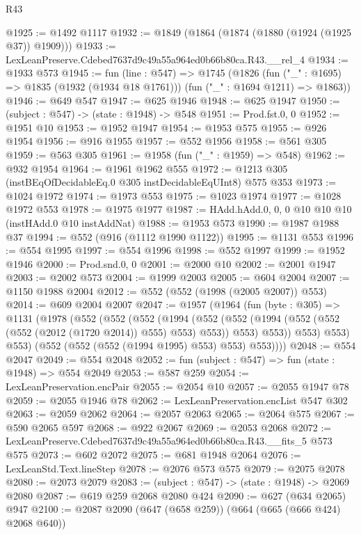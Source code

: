 \begin{lexlean}{R43}
\begin{coremodule}
@1925 := @1492 @1117
@1932 := @1849 (@1864 (@1874 (@1880 (@1924 (@1925 @37)) @1909)))
@1933 := LexLeanPreserve.Cdebed7637d9c49a55a964ed0b66b80ca.R43.__rel_4
@1934 := @1933 @573
@1945 := fun (line : @547) =>
  @1745
    (@1826
      (fun ("_" : @1695) => @1835 (@1932 (@1934 @18 @1761)))
      (fun ("_" : @1694 @1211) => @1863))
@1946 := @649 @547
@1947 := @625 @1946
@1948 := @625 @1947
@1950 := (subject : @547) -> (state : @1948) -> @548
@1951 := Prod.fst.{0, 0}
@1952 := @1951 @10
@1953 := @1952 @1947
@1954 := @1953 @575
@1955 := @926 @1954
@1956 := @916 @1955
@1957 := @552 @1956
@1958 := @561 @305
@1959 := @563 @305
@1961 := @1958 (fun ("_" : @1959) => @548)
@1962 := @932 @1954
@1964 := @1961 @1962 @555
@1972 := @1213 @305 (instBEqOfDecidableEq.{0} @305 instDecidableEqUInt8) @575 @353
@1973 := @1024 @1972
@1974 := @1973 @553
@1975 := @1023 @1974
@1977 := @1028 @1972 @553
@1978 := @1975 @1977
@1987 := HAdd.hAdd.{0, 0, 0} @10 @10 @10 (instHAdd.{0} @10 instAddNat)
@1988 := @1953 @573
@1990 := @1987 @1988 @37
@1994 := @552 (@916 (@1112 @1990 @1122))
@1995 := @1131 @553
@1996 := @554 @1995
@1997 := @554 @1996
@1998 := @552 @1997
@1999 := @1952 @1946
@2000 := Prod.snd.{0, 0}
@2001 := @2000 @10
@2002 := @2001 @1947
@2003 := @2002 @573
@2004 := @1999 @2003
@2005 := @604 @2004
@2007 := @1150 @1988 @2004
@2012 := @552 (@552 (@1998 (@2005 @2007)) @553)
@2014 := @609 @2004 @2007
@2047 := @1957
    (@1964
      (fun (byte : @305) =>
      @1131
        (@1978
          (@552
            (@552
              (@552
                (@1994
                  (@552
                    (@552 (@1994 (@552 (@552 (@552 (@2012 (@1720 @2014)) @555) @553) @553)) @553)
                    @553))
                @553)
              @553)
            @553)
          (@552 (@552 (@552 (@1994 @1995) @553) @553) @553))))
@2048 := @554 @2047
@2049 := @554 @2048
@2052 := fun (subject : @547) => fun (state : @1948) => @554 @2049
@2053 := @587 @259
@2054 := LexLeanPreservation.encPair
@2055 := @2054 @10
@2057 := @2055 @1947 @78
@2059 := @2055 @1946 @78
@2062 := LexLeanPreservation.encList @547 @302
@2063 := @2059 @2062
@2064 := @2057 @2063
@2065 := @2064 @575
@2067 := @590 @2065 @597
@2068 := @922 @2067
@2069 := @2053 @2068
@2072 := LexLeanPreserve.Cdebed7637d9c49a55a964ed0b66b80ca.R43.__fits_5 @573 @575
@2073 := @602 @2072
@2075 := @681 @1948 @2064
@2076 := LexLeanStd.Text.lineStep
@2078 := @2076 @573 @575
@2079 := @2075 @2078
@2080 := @2073 @2079
@2083 := (subject : @547) -> (state : @1948) -> @2069 @2080
@2087 := @619 @259 @2068 @2080 @424
@2090 := @627 (@634 @2065) @947
@2100 := @2087 @2090 (@647 (@658 @259)) (@664 (@665 (@666 @424) @2068 @640))

\end{coremodule}
\end{lexlean}
